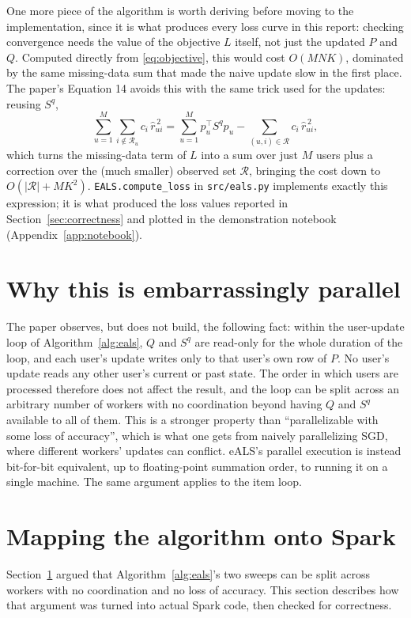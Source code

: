 One more piece of the algorithm is worth deriving before moving to the
implementation, since it is what produces every loss curve in this report:
checking convergence needs the value of the objective $L$ itself, not just
the updated $P$ and $Q$. Computed directly from \eqref{eq:objective}, this
would cost $O(MNK)$, dominated by the same missing-data sum that made the
naive update slow in the first place. The paper's Equation 14 avoids this
with the same trick used for the updates: reusing $S^q$,
\[
  \sum_{u=1}^{M}\sum_{i\notin\mathcal{R}_u} c_i\,\hat r_{ui}^{\,2}
  = \sum_{u=1}^{M} p_u^\top S^q p_u - \sum_{(u,i)\in\mathcal{R}} c_i\,\hat r_{ui}^{\,2},
\]
which turns the missing-data term of $L$ into a sum over just $M$ users
plus a correction over the (much smaller) observed set $\mathcal{R}$,
bringing the cost down to $O(|\mathcal{R}|+MK^2)$.
\texttt{EALS.compute\_loss} in \texttt{src/eals.py} implements exactly this
expression; it is what produced the loss values reported in
Section~\ref{sec:correctness} and plotted in the demonstration notebook
(Appendix~\ref{app:notebook}).

\section{Why this is embarrassingly parallel}
\label{sec:parallel}

The paper observes, but does not build, the following fact: within the
user-update loop of Algorithm~\ref{alg:eals}, $Q$ and $S^q$ are read-only
for the whole duration of the loop, and each user's update writes only to
that user's own row of $P$. No user's update reads any other user's
current or past state. The order in which users are processed therefore
does not affect the result, and the loop can be split across an arbitrary
number of workers with no coordination beyond having $Q$ and $S^q$
available to all of them. This is a stronger property than
``parallelizable with some loss of accuracy'', which is what one gets from
naively parallelizing SGD, where different workers' updates can conflict.
eALS's parallel execution is instead bit-for-bit equivalent, up to
floating-point summation order, to running it on a single machine. The same
argument applies to the item loop.

\section{Mapping the algorithm onto Spark}
\label{sec:spark}

Section~\ref{sec:parallel} argued that Algorithm~\ref{alg:eals}'s two
sweeps can be split across workers with no coordination and no loss of
accuracy. This section describes how that argument was turned into actual
Spark code, then checked for correctness.

